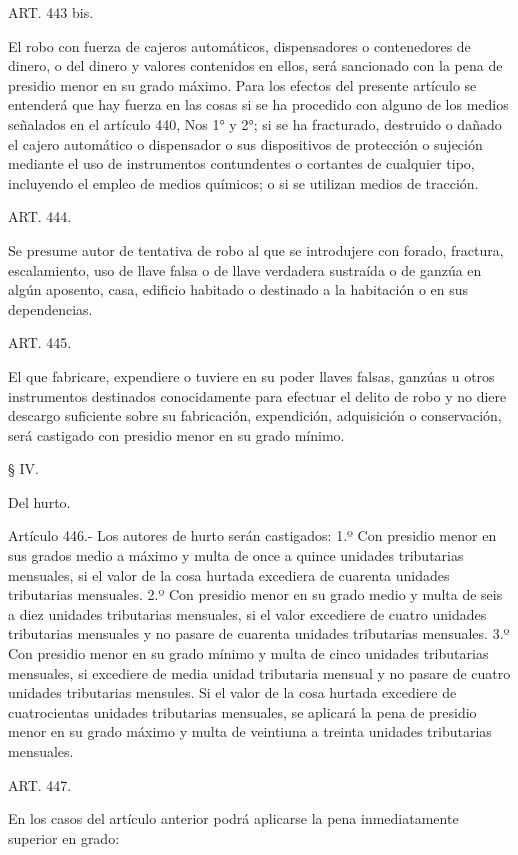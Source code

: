     ART. 443 bis.

    El robo con fuerza de cajeros automáticos, dispensadores o contenedores de dinero, o del dinero y valores contenidos en ellos, será sancionado con la pena de presidio menor en su grado máximo. Para los efectos del presente artículo se entenderá que hay fuerza en las cosas si se ha procedido con alguno de los medios señalados en el artículo 440, Nos 1° y 2°; si se ha fracturado, destruido o dañado el cajero automático o dispensador o sus dispositivos de protección o sujeción mediante el uso de instrumentos contundentes o cortantes de cualquier tipo, incluyendo el empleo de medios químicos; o si se utilizan medios de tracción.

    ART. 444.

    Se presume autor de tentativa de robo al que se introdujere con forado, fractura, escalamiento, uso de llave falsa o de llave verdadera sustraída o de ganzúa en algún aposento, casa, edificio habitado o destinado a la habitación o en sus dependencias.


    ART. 445.

    El que fabricare, expendiere o tuviere en su poder llaves falsas, ganzúas u otros instrumentos destinados conocidamente para efectuar el delito de robo y no diere descargo suficiente sobre su fabricación, expendición, adquisición o conservación, será castigado con presidio menor en su grado mínimo.


    § IV.

    Del hurto.


    Artículo 446.- Los autores de hurto serán castigados:
    1.º Con presidio menor en sus grados medio a máximo y multa de once a quince unidades tributarias mensuales, si el valor de la cosa hurtada excediera de cuarenta unidades tributarias mensuales.
    2.º Con presidio menor en su grado medio y multa de seis a diez unidades tributarias mensuales, si el valor excediere de cuatro unidades tributarias mensuales y no pasare de cuarenta unidades tributarias mensuales.
    3.º Con presidio menor en su grado mínimo y multa de cinco unidades tributarias mensuales, si excediere de media unidad tributaria mensual y no pasare de cuatro unidades tributarias mensules.
    Si el valor de la cosa hurtada excediere de cuatrocientas unidades tributarias mensuales, se aplicará la pena de presidio menor en su grado máximo y multa de veintiuna a treinta unidades tributarias mensuales.


    ART. 447.

    En los casos del artículo anterior podrá aplicarse la pena inmediatamente superior en grado:
   
